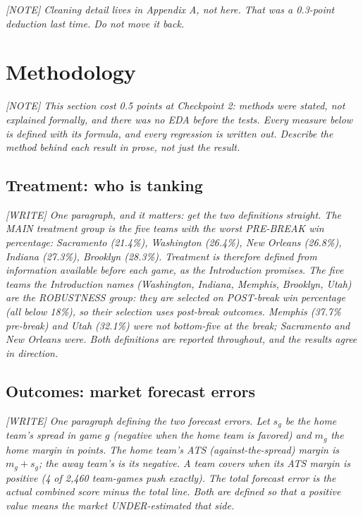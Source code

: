 \documentclass[12pt,letterpaper]{article}
\newcommand{\writeprompt}[1]{{\color{gray}\textit{[WRITE] #1}}}
\newcommand{\authnote}[1]{{\color{gray}\textit{[NOTE] #1}}}
\begin{document}
\authnote{Cleaning detail lives in Appendix A, not here. That was a
0.3-point deduction last time. Do not move it back.}


\section{Methodology}

\authnote{This section cost 0.5 points at Checkpoint 2: methods were stated,
not explained formally, and there was no EDA before the tests. Every measure
below is defined with its formula, and every regression is written out.
Describe the method behind each result in prose, not just the result.}

\subsection{Treatment: who is tanking}

\writeprompt{One paragraph, and it matters: get the two definitions straight.
The MAIN treatment group is the five teams with the worst PRE-BREAK win
percentage: Sacramento (21.4\%), Washington (26.4\%), New Orleans (26.8\%),
Indiana (27.3\%), Brooklyn (28.3\%). Treatment is therefore defined from
information available before each game, as the Introduction promises. The
five teams the Introduction names (Washington, Indiana, Memphis, Brooklyn,
Utah) are the ROBUSTNESS group: they are selected on POST-break win
percentage (all below 18\%), so their selection uses post-break outcomes.
Memphis (37.7\% pre-break) and Utah (32.1\%) were not bottom-five at the
break; Sacramento and New Orleans were. Both definitions are reported
throughout, and the results agree in direction.}

\subsection{Outcomes: market forecast errors}

\writeprompt{One paragraph defining the two forecast errors. Let $s_g$ be the
home team's spread in game $g$ (negative when the home team is favored) and
$m_g$ the home margin in points. The home team's ATS (against-the-spread)
margin is $m_g + s_g$; the away team's is its negative. A team covers when
its ATS margin is positive (4 of 2,460 team-games push exactly). The total
forecast error is the actual combined score minus the total line. Both are
defined so that a positive value means the market UNDER-estimated that side.}
\end{document}
